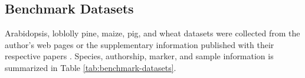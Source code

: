 \documentclass[9pt,twocolumn,twoside]{g3_article/gsag3jnl}
\newcommand{\etal}{\textit{et al.}}
\begin{document}
{\subsection*{Benchmark Datasets}

Arabidopsis, loblolly pine, maize, pig, and wheat datasets were collected from the author's web pages
or the supplementary information published with their respective papers \citep{loudet2002, resende2012, crossa2010, cleveland2012, thavamanikumar2015}.
Species, authorship, marker, and sample information is summarized in Table \ref{tab:benchmark-datasets}.

\newcommand{\loudet}        {\multirow{2}{3cm}{Loudet \etal ~2002}}
\newcommand{\resende}       {\multirow{2}{3cm}{Resende \etal ~2012}}
\newcommand{\crossa}        {\multirow{2}{3cm}{Crossa \etal ~2010}}
\newcommand{\cleveland}     {\multirow{2}{3cm}{Cleveland \etal ~2012}}
\newcommand{\thavamanikumar}{\multirow{2}{3cm}{Thavamanikumar \etal ~2015}}

}
\end{document}
